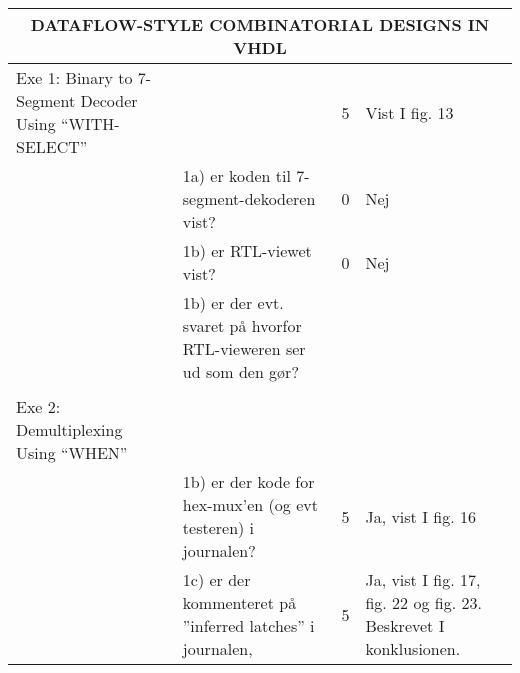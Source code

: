 \begin{table}[h]
    \small
    \begin{tabularx}{\textwidth}{p{3.5cm}Xp{5mm}X}

        \toprule
        \multicolumn{4}{c}{DATAFLOW-STYLE COMBINATORIAL DESIGNS IN VHDL}                                                                                                                                                                \\\midrule
        Exe 1: Binary to 7-Segment Decoder Using “WITH-SELECT” &                                                                                                & 5 & Vist I fig. 13                                                    \\
                                                               & 1a) er koden til 7-segment-dekoderen vist?                                                     & 0 & Nej                                                               \\
                                                               & 1b) er RTL-viewet vist?                                                                        & 0 & Nej                                                               \\
                                                               & 1b) er der evt. svaret på hvorfor RTL-vieweren ser ud som den gør?                             &   &                                                                   \\
                                                               &                                                                                                &   &                                                                   \\\midrule
        Exe 2: Demultiplexing Using “WHEN”                     &                                                                                                &   &                                                                   \\
                                                               & 1b) er der kode for hex-mux’en (og evt testeren) i journalen?                                  & 5 & Ja, vist I fig. 16                                                \\
                                                               & 1c) er der kommenteret på ”inferred latches” i journalen,                                      & 5 & Ja, vist I fig. 17, fig. 22 og fig. 23. Beskrevet I konklusionen. \\

\end{tabularx}
\end{table}
